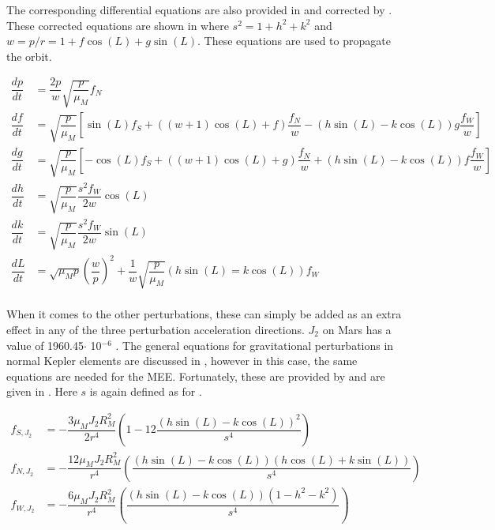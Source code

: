 The corresponding differential equations are also provided in \cite{hintz2008survey} and corrected by \cite{gebbett2014multi}. These corrected equations are shown in  where $s^{2}=1+h^{2}+k^{2}$ and $w=p/r=1+f\cos\left(L\right)+g\sin\left(L\right)$. These equations are used to propagate the orbit.

\begin{equation} \label{eq:eom_mee}
\begin{split}
\dfrac{dp}{dt}&=\dfrac{2p}{w}\sqrt{\dfrac{p}{\mu_{M}}}f_{N}\\
\dfrac{df}{dt}&=\sqrt{\dfrac{p}{\mu_{M}}}\left[\sin\left(L\right)f_{S}+\left(\left(w+1\right)\cos\left(L\right)+f\right)\dfrac{f_{N}}{w}-\left(h\sin\left(L\right)-k\cos\left(L\right)\right)g\dfrac{f_{W}}{w}\right]\\
\dfrac{dg}{dt}&=\sqrt{\dfrac{p}{\mu_{M}}}\left[-\cos\left(L\right)f_{S}+\left(\left(w+1\right)\cos\left(L\right)+g\right)\dfrac{f_{N}}{w}+\left(h\sin\left(L\right)-k\cos\left(L\right)\right)f\dfrac{f_{W}}{w}\right]\\
\dfrac{dh}{dt}&=\sqrt{\dfrac{p}{\mu_{M}}}\dfrac{s^{2}f_{W}}{2w}\cos\left(L\right)\\
\dfrac{dk}{dt}&=\sqrt{\dfrac{p}{\mu_{M}}}\dfrac{s^{2}f_{W}}{2w}\sin\left(L\right)\\
\dfrac{dL}{dt}&=\sqrt{\mu_{M}p}\left(\dfrac{w}{p}\right)^{2}+\dfrac{1}{w}\sqrt{\dfrac{p}{\mu_{M}}}\left(h\sin\left(L\right)=k\cos\left(L\right)\right)f_{W}\\
\end{split}
\end{equation}

When it comes to the other perturbations, these can simply be added as an extra effect in any of the three perturbation acceleration directions. $J_{2}$ on Mars has a value of 1960.45$\cdot$ 10$^{-6}$ \cite{williams2015}. The general equations for gravitational perturbations in normal Kepler elements are discussed in \cite{noomen2011kepler}, however in this case, the same equations are needed for the \ac{MEE}. Fortunately, these are provided by \cite{kechichian2000minimum} and are given in . Here $s$ is again defined as for .

\begin{equation} \label{eq:j2}
\begin{split}
f_{S,J_{2}}&=-\dfrac{3\mu_{M}J_{2}R_{M}^{2}}{2r^{4}}\left(1-12\dfrac{\left(h\sin\left(L\right)-k\cos\left(L\right)\right)^{2}}{s^{4}}\right)\\
f_{N,J_{2}}&=-\dfrac{12\mu_{M}J_{2}R_{M}^{2}}{r^{4}}\left(\dfrac{\left(h\sin\left(L\right)-k\cos\left(L\right)\right)\left(h\cos\left(L\right)+k\sin\left(L\right)\right)}{s^{4}}\right)\\
f_{W,J_{2}}&=-\dfrac{6\mu_{M}J_{2}R_{M}^{2}}{r^{4}}\left(\dfrac{\left(h\sin\left(L\right)-k\cos\left(L\right)\right)\left(1-h^{2}-k^{2}\right)}{s^{4}}\right)\\
\end{split}
\end{equation}

